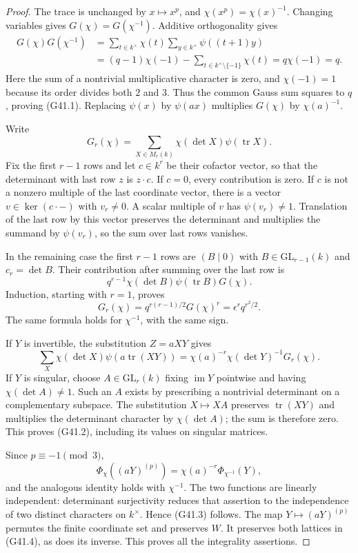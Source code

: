 \begin{proof}
The trace is unchanged by $x\mapsto x^p$, and
$\chi(x^p)=\chi(x)^{-1}$.  Changing variables gives
$G(\chi)=G(\chi^{-1})$.  Additive orthogonality gives
\begin{align*}
 G(\chi)G(\chi^{-1})
  &=\sum_{t\in k^\times}\chi(t)
                  \sum_{y\in k^\times}\psi((t+1)y)\\
  &=(q-1)\chi(-1)
                  -\sum_{t\in k^\times\setminus\{-1\}}\chi(t)
    =q\chi(-1)=q.
\end{align*}
Here the sum of a nontrivial multiplicative character is zero,
and $\chi(-1)=1$ because its order divides both $2$ and $3$.
Thus the common Gauss sum squares to $q$, proving (G41.1).
Replacing $\psi(x)$ by $\psi(ax)$ multiplies $G(\chi)$ by
$\chi(a)^{-1}$.

Write
\[
       G_r(\chi)=\sum_{X\in M_r(k)}
                          \chi(\det X)\psi(\operatorname{tr}X).
\]
Fix the first $r-1$ rows and let $c\in k^r$ be their cofactor
vector, so that the determinant with last row $z$ is $z\cdot c$.
If $c=0$, every contribution is zero.  If $c$ is not a nonzero
multiple of the last coordinate vector, there is a vector
$v\in\ker(c\cdot-)$ with $v_r\ne0$.  A scalar multiple of $v$
has $\psi(v_r)\ne1$.  Translation of the last row by this vector
preserves the determinant and multiplies the summand by
$\psi(v_r)$, so the sum over last rows vanishes.

In the remaining case the first $r-1$ rows are $(B\mid0)$ with
$B\in\mathrm{GL}_{r-1}(k)$ and $c_r=\det B$.  Their contribution
after summing over the last row is
\[
 q^{r-1}\chi(\det B)\psi(\operatorname{tr}B)G(\chi).
\]
Induction, starting with $r=1$, proves
\[
 G_r(\chi)=q^{r(r-1)/2}G(\chi)^r
                       =\epsilon^r q^{r^2/2}.          \tag{G41.5}
\]
The same formula holds for $\chi^{-1}$, with the same sign.

If $Y$ is invertible, the substitution $Z=aXY$ gives
\[
 \sum_X\chi(\det X)\psi(a\operatorname{tr}(XY))
       =\chi(a)^{-r}\chi(\det Y)^{-1}G_r(\chi).
\]
If $Y$ is singular, choose $A\in\mathrm{GL}_r(k)$ fixing
$\operatorname{im}Y$ pointwise and having $\chi(\det A)\ne1$.
Such an $A$ exists by prescribing a nontrivial determinant on
a complementary subspace.  The substitution $X\mapsto XA$
preserves $\operatorname{tr}(XY)$ and multiplies the determinant
character by $\chi(\det A)$; the sum is therefore zero.
This proves (G41.2), including its values on singular matrices.

Since $p\equiv-1\pmod3$,
\[
 \Phi_\chi((aY)^{(p)})
                  =\chi(a)^{-r}\Phi_{\chi^{-1}}(Y),
\]
and the analogous identity holds with $\chi^{-1}$.  The two
functions are linearly independent: determinant surjectivity
reduces that assertion to the independence of two distinct
characters on $k^\times$.  Hence (G41.3) follows.  The map
$Y\mapsto(aY)^{(p)}$ permutes the finite coordinate set and
preserves $W$.  It preserves both lattices in (G41.4), as does
its inverse.  This proves all the integrality assertions.
\end{proof}

